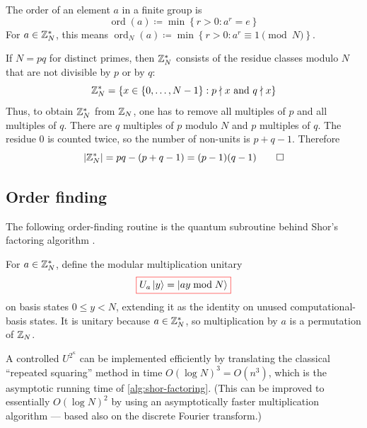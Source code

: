 \begin{definition}[Order]\label{def:multiplicative-order}
The order of an element \(a\) in a finite group is
\[
\operatorname{ord}(a)
\coloneqq
\min
\left\{
r>0:a^r=e
\right\}
\]
For
\(
a\in\mathbb{Z}_N^*
\),
this means
\(
\operatorname{ord}_N(a)
\coloneqq
\min
\left\{
r>0:a^r\equiv1\pmod N
\right\}
\).
\end{definition}

\begin{remark}
If
\(
N=pq
\)
for distinct primes, then
\(
\mathbb{Z}_N^*
\)
consists of the residue classes modulo \(N\) that are not divisible by \(p\) or by \(q\):
\[
\mathbb{Z}_N^*
=
\{x\in\{0,\ldots,N-1\}:p\nmid x\text{ and }q\nmid x\}
\]
Thus, to obtain $\mathbb{Z}_N^*$ from $\mathbb{Z}_N$, one has to remove all multiples of \(p\) and all multiples of \(q\).
There are \(q\) multiples of \(p\) modulo \(N\)
and \(p\) multiples of \(q\).
The residue \(0\) is counted twice, so the number of non-units is
\(
p+q-1
\).
Therefore
\[
|\mathbb{Z}_N^*|
=
pq-(p+q-1)
=
(p-1)(q-1)
\qedhere
\]
\end{remark}

\subsection{Order finding}\label{sec:order-finding}

The following order-finding routine is the quantum subroutine behind Shor's factoring algorithm \cite{shorAlgorithms,laneveQuantumAlgorithms}.

For
\(
a\in\mathbb{Z}_N^*
\),
define the modular multiplication unitary
\begin{equation}\label{eq:modular-multiplication-unitary}
{\color{red}\boxed{\color{black}
U_a\ket y
=
\ket{ay\bmod N}
}}
\end{equation}
on basis states \(0\leq y<N\), extending it as the identity on unused computational-basis states.
It is unitary because \(a\in\mathbb{Z}_N^*\), so multiplication by \(a\) is a permutation of \(\mathbb{Z}_N\).

A controlled $U^{2^\kappa}$ can be implemented efficiently by translating the classical ``repeated squaring'' method in time \(O(\log N)^3 = O(n^3)\), which is the asymptotic running time of \autoref{alg:shor-factoring}.
(This can be improved to essentially \(O(\log N)^2\) by using an asymptotically faster multiplication algorithm --- based also on the discrete Fourier transform.)



